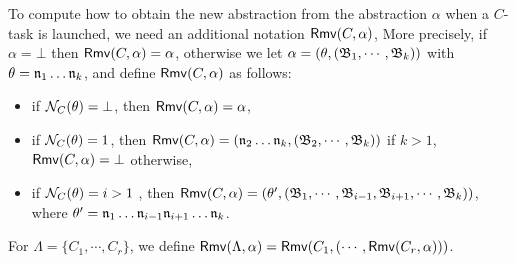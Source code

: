 {{\begin{minipage}{0.9\textwidth}
\begin{enumerate}
\end{enumerate}
\end{minipage}
}

To compute how to obtain the new abstraction from the abstraction $\alpha$ when a $C$-task is launched, we need an additional notation $\mathsf{Rmv}(C,\alpha)$,
More precisely, if $\alpha = \bot$ then $\mathsf{Rmv}(C,\alpha) = \alpha$, otherwise we let $\alpha = (\theta, ({\mathfrak{B} }_1,\cdots, {\mathfrak{B} }_k))$ with $\theta = \mathfrak{n}_1\dots\mathfrak{n}_k$, and define $\mathsf{Rmv}(C,\alpha)$ as follows:
\begin{itemize}
    \item if $\mathcal{N}_C(\theta) = \bot$, then $\mathsf{Rmv}(C,\alpha) = \alpha$,
    \item if $\mathcal{N}_C(\theta) = 1$, then $\mathsf{Rmv}(C,\alpha) = (\mathfrak{n}_2\dots\mathfrak{n}_k,({\mathfrak{B} }_2,\cdots,{\mathfrak{B} }_k))$ if $k>1$, $\mathsf{Rmv}(C,\alpha) = \bot$ otherwise,
    \item if $\mathcal{N}_C(\theta) = i > 1$ , then $\mathsf{Rmv}(C,\alpha) = (\theta',({\mathfrak{B} }_1,\cdots,{\mathfrak{B} }_{i-1},{\mathfrak{B} }_{i+1},\cdots,{\mathfrak{B} }_{k}))$, where $\theta' = \mathfrak{n}_1\dots\mathfrak{n}_{i-1}\mathfrak{n}_{i+1}\dots\mathfrak{n}_k$.
\end{itemize}
For $\Lambda = \{C_1,\cdots,C_r\}$, we define $\mathsf{Rmv}(\Lambda,\alpha) = \mathsf{Rmv}(C_1,(\cdots,\mathsf{Rmv}(C_r,\alpha)))$.

}
